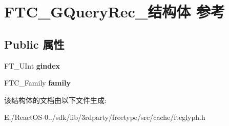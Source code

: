 \hypertarget{struct_f_t_c___g_query_rec__}{}\section{F\+T\+C\+\_\+\+G\+Query\+Rec\+\_\+结构体 参考}
\label{struct_f_t_c___g_query_rec__}
\subsection*{Public 属性}
\begin{DoxyCompactItemize}
\item 
\mbox{\label{struct_f_t_c___g_query_rec___a4f78d9b44f1442aa04c581ee044bd577}} 
F\+T\+\_\+\+U\+Int {\bfseries gindex}
\item 
\mbox{\label{struct_f_t_c___g_query_rec___a0e36befb15d9fca397542c5e1fff4263}} 
F\+T\+C\+\_\+\+Family {\bfseries family}
\end{DoxyCompactItemize}


该结构体的文档由以下文件生成\+:\begin{DoxyCompactItemize}
\item 
E\+:/\+React\+O\+S-\/0../sdk/lib/3rdparty/freetype/src/cache/ftcglyph.\+h\end{DoxyCompactItemize}
